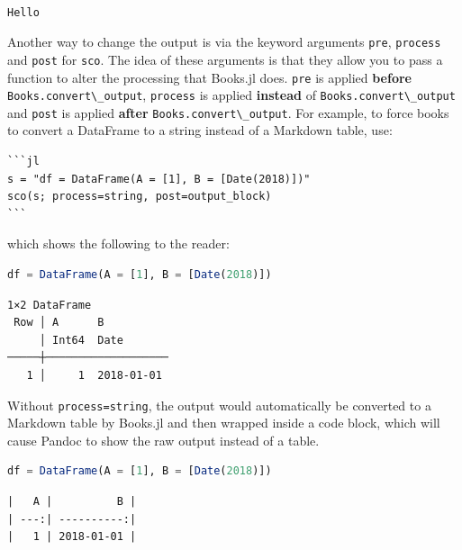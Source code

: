 \documentclass[
  notoc %
]{tufte-book}
\newcommand{\passthrough}[1]{#1}
\begin{document}
\begin{lstlisting}[language=Output]

Hello

\end{lstlisting}

Another way to change the output is via the keyword arguments
\passthrough{\lstinline!pre!}, \passthrough{\lstinline!process!} and
\passthrough{\lstinline!post!} for \passthrough{\lstinline!sco!}. The
idea of these arguments is that they allow you to pass a function to
alter the processing that Books.jl does. \passthrough{\lstinline!pre!}
is applied \textbf{before}
\passthrough{\lstinline!Books.convert\_output!},
\passthrough{\lstinline!process!} is applied \textbf{instead} of
\passthrough{\lstinline!Books.convert\_output!} and
\passthrough{\lstinline!post!} is applied \textbf{after}
\passthrough{\lstinline!Books.convert\_output!}. For example, to force
books to convert a DataFrame to a string instead of a Markdown table,
use:

\begin{lstlisting}
```jl
s = "df = DataFrame(A = [1], B = [Date(2018)])"
sco(s; process=string, post=output_block)
```
\end{lstlisting}

which shows the following to the reader:

\begin{lstlisting}[language=Julia]
df = DataFrame(A = [1], B = [Date(2018)])
\end{lstlisting}

\begin{lstlisting}[language=Output]
1×2 DataFrame
 Row │ A      B
     │ Int64  Date
─────┼───────────────────
   1 │     1  2018-01-01
\end{lstlisting}

Without \passthrough{\lstinline!process=string!}, the output would
automatically be converted to a Markdown table by Books.jl and then
wrapped inside a code block, which will cause Pandoc to show the raw
output instead of a table.

\begin{lstlisting}[language=Julia]
df = DataFrame(A = [1], B = [Date(2018)])
\end{lstlisting}

\begin{lstlisting}[language=Output]
|   A |          B |
| ---:| ----------:|
|   1 | 2018-01-01 |

\end{lstlisting}
\end{document}
